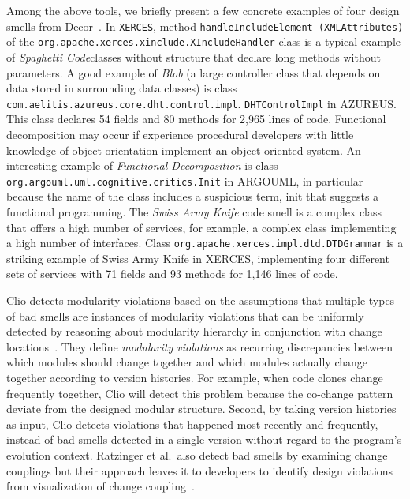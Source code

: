 Among the above tools, we briefly present a few concrete examples of four design smells from Decor~\cite{Moha2009:designdefect}. In {\tt XERCES}, method {\tt handleIncludeElement (XMLAttributes)} of the {\tt org\-.apache\-.xerces.\-xinclude.\-XIncludeHandler} class is a typical example of {\em Spaghetti Code}\textemdash classes without structure that declare long methods without parameters. A good example of {\em Blob} (a large controller class that depends on data stored in surrounding data classes) is class {\tt com.\-aelitis.\-azureus.\-core.\-dht.\-control.\-impl}. {\tt DHTControlImpl} in AZUREUS. This class declares 54 fields and 80 methods for 2,965 lines of code. Functional decomposition may occur if experience procedural developers with little knowledge of object-orientation implement an object-oriented system. An interesting example of {\em Functional Decomposition} is class {\tt org.\-argouml.\-uml.\-cognitive.\-critics.\-Init} in ARGOUML, in particular because the name of the class includes a suspicious term, init that suggests a functional programming. The {\em Swiss Army Knife} code smell is a complex class that offers a high number of services, for example, a complex class implementing a high number of interfaces. Class {\tt org.\-apache.\-xerces.\-impl.\-dtd.\-DTDGrammar} is a striking example of Swiss Army Knife in XERCES, implementing four different sets of services with 71 fields and 93 methods for 1,146 lines of code.

Clio detects modularity violations based on the assumptions that multiple types of bad smells are instances of modularity violations that can be uniformly detected by reasoning about modularity hierarchy in conjunction with change locations~\cite{Wong2011:cleo}. They define {\em modularity violations} as recurring discrepancies between which modules should change together and which modules actually change together according to version histories. For example, when code clones change frequently together, Clio will detect this problem because the co-change pattern deviate from the designed modular structure. Second, by taking version histories as input, Clio detects violations that happened most recently and frequently, instead of bad smells detected in a single version without regard to the program's evolution context. Ratzinger et al.~also detect bad smells by examining change couplings but their approach leaves it to developers to identify design violations from visualization of change coupling~\cite{ratzinger:msr05}. 


